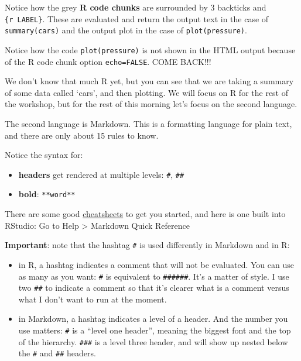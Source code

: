 \documentclass[]{book}
\providecommand{\tightlist}{%
  \setlength{\itemsep}{0pt}\setlength{\parskip}{0pt}}
\begin{document}
Notice how the grey \textbf{R code chunks} are surrounded by 3 backticks and \texttt{\{r\ LABEL\}}. These are evaluated and return the output text in the case of \texttt{summary(cars)} and the output plot in the case of \texttt{plot(pressure)}.

Notice how the code \texttt{plot(pressure)} is not shown in the HTML output because of the R code chunk option \texttt{echo=FALSE}.
COME BACK!!!

We don't know that much R yet, but you can see that we are taking a summary of some data called `cars', and then plotting. We will focus on R for the rest of the workshop, but for the rest of this morning let's focus on the second language.

The second language is Markdown. This is a formatting language for plain text, and there are only about 15 rules to know.

Notice the syntax for:

\begin{itemize}
\tightlist
\item
  \textbf{headers} get rendered at multiple levels: \texttt{\#}, \texttt{\#\#}
\item
  \textbf{bold}: \texttt{**word**}
\end{itemize}

There are some good \href{https://github.com/adam-p/markdown-here/wiki/Markdown-Here-Cheatsheet}{cheatsheets} to get you started, and here is one built into RStudio: Go to Help \textgreater{} Markdown Quick Reference

\textbf{Important}: note that the hashtag \texttt{\#} is used differently in Markdown and in R:

\begin{itemize}
\tightlist
\item
  in R, a hashtag indicates a comment that will not be evaluated. You can use as many as you want: \texttt{\#} is equivalent to \texttt{\#\#\#\#\#\#}. It's a matter of style. I use two \texttt{\#\#} to indicate a comment so that it's clearer what is a comment versus what I don't want to run at the moment.
\item
  in Markdown, a hashtag indicates a level of a header. And the number you use matters: \texttt{\#} is a ``level one header'', meaning the biggest font and the top of the hierarchy. \texttt{\#\#\#} is a level three header, and will show up nested below the \texttt{\#} and \texttt{\#\#} headers.
\end{itemize}
\end{document}
